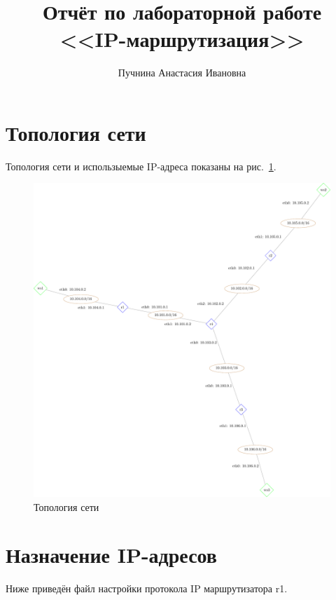 \documentclass[a4paper,12pt]{article}
\title{Отчёт по лабораторной работе \\ <<IP-маршрутизация>>}
\author{Пучнина Анастасия Ивановна}
\begin{document}
\maketitle

\tableofcontents


\section{Топология сети}

Топология сети и использыемые IP-адреса показаны на рис.~\ref{fig:network}.

\begin{figure}
\centering
\includegraphics[width=\textwidth]{includes/network_gv.pdf}
\caption{Топология сети}
\label{fig:network}
\end{figure}


\section{Назначение IP-адресов}

Ниже приведён файл настройки протокола IP маршрутизатора r1.
\end{document}
